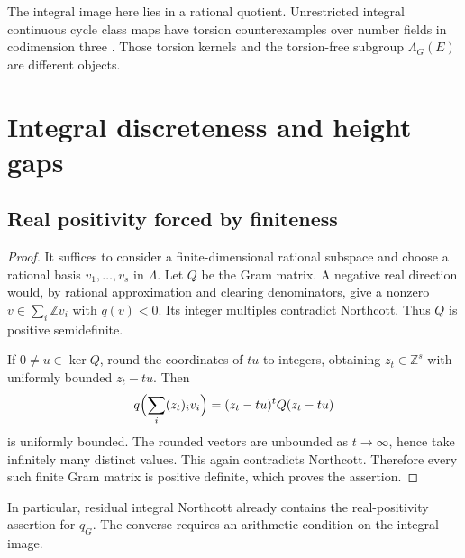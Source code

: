 \documentclass[11pt,a4paper]{article}
\newtheorem{lemma}[theorem]{Lemma}
\theoremstyle{definition}
\newcommand{\Q}{\mathbb Q}\newcommand{\R}{\mathbb R}\newcommand{\C}{\mathbb C}
\newcommand{\Z}{\mathbb Z}\newcommand{\A}{\mathbb A}\newcommand{\Fbar}{\overline F}
\numberwithin{equation}{section}
\begin{document}
The integral image here lies in a rational quotient. Unrestricted
integral continuous cycle class maps have torsion counterexamples
over number fields in codimension three
\cite[Theorems~1.3--1.4]{ScaviaSuzuki}. Those torsion kernels and
the torsion-free subgroup \(\Lambda_G(E)\) are different objects.




\section{Integral discreteness and height gaps}\label{sec:lattices}

\subsection{Real positivity forced by finiteness}\label{sec:northcott-real}


\begin{proof}
It suffices to consider a finite-dimensional rational subspace
and choose a rational basis \(v_1,\ldots,v_s\) in \(\Lambda\).
Let \(Q\) be the Gram matrix. A negative real direction would,
by rational approximation and clearing denominators, give a
nonzero \(v\in\sum_i\Z v_i\) with \(q(v)<0\). Its integer
multiples contradict Northcott. Thus \(Q\) is positive semidefinite.

If \(0\ne u\in\ker Q\), round the coordinates of \(tu\) to
integers, obtaining \(z_t\in\Z^s\) with uniformly bounded
\(z_t-tu\). Then
\[
 q\Bigl(\sum_i(z_t)_iv_i\Bigr)
       =(z_t-tu)^tQ(z_t-tu)
\]
is uniformly bounded. The rounded vectors are unbounded as
\(t\to\infty\), hence take infinitely many distinct values.
This again contradicts Northcott. Therefore every such finite
Gram matrix is positive definite, which proves the assertion.
\end{proof}

In particular, residual integral Northcott already contains the
real-positivity assertion for \(q_G\). The converse requires an
arithmetic condition on the integral image.
\end{document}

